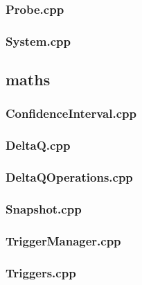 \subsubsection*{Probe.cpp}


\subsubsection*{System.cpp}


\subsection*{maths}

\subsubsection*{ConfidenceInterval.cpp}


\subsubsection*{DeltaQ.cpp}


\subsubsection*{DeltaQOperations.cpp}


\subsubsection*{Snapshot.cpp}


\subsubsection*{TriggerManager.cpp}


\subsubsection*{Triggers.cpp}


